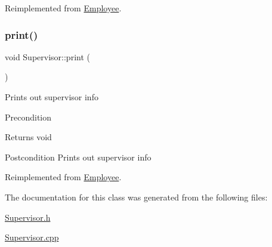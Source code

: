 Reimplemented from \hyperlink{classEmployee_a01c2c44e15434237db28832f6972e960}{Employee}.

\mbox{\label{classSupervisor_a92483dc9a54904d79b46c6ec4efb3f54}} 
\subsubsection{\texorpdfstring{print()}{print()}}
{\footnotesize\ttfamily void Supervisor\+::print (\begin{DoxyParamCaption}{ }\end{DoxyParamCaption})\hspace{0.3cm}{\ttfamily [virtual]}}

Prints out supervisor info

\begin{DoxyPrecond}{Precondition}

\end{DoxyPrecond}
\begin{DoxyReturn}{Returns}
void 
\end{DoxyReturn}
\begin{DoxyPostcond}{Postcondition}
Prints out supervisor info 
\end{DoxyPostcond}


Reimplemented from \hyperlink{classEmployee_a79556ad700627dba88049f487a34a762}{Employee}.



The documentation for this class was generated from the following files\+:\begin{DoxyCompactItemize}
\item 
\hyperlink{Supervisor_8h}{Supervisor.\+h}\item 
\hyperlink{Supervisor_8cpp}{Supervisor.\+cpp}\end{DoxyCompactItemize}
